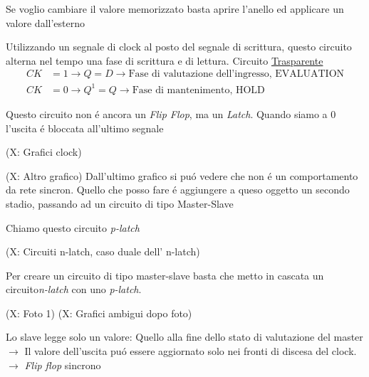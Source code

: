 \documentclass{article}
\begin{document}
Se voglio cambiare il valore memorizzato basta aprire l'anello ed applicare un valore dall'esterno

Utilizzando un segnale di clock al posto del segnale di scrittura, questo circuito alterna nel tempo una fase di scrittura e di lettura.
Circuito \underline{Trasparente}
\[
    \begin{aligned}
        CK &= 1 \rightarrow Q = D \rightarrow \text{Fase di valutazione dell'ingresso, EVALUATION}\\
        CK &= 0 \rightarrow Q^1 = Q \rightarrow \text{Fase di mantenimento, HOLD}
    \end{aligned}
\]

Questo circuito non \'e ancora un \textit{Flip Flop}, ma un \textit{Latch}. Quando siamo a $0$ l'uscita \'e bloccata all'ultimo segnale

(X: Grafici clock)

(X: Altro grafico)
Dall'ultimo grafico si pu\'o vedere che non \'e un comportamento da rete sincron. Quello che posso fare \'e aggiungere a queso oggetto un secondo stadio, passando ad un circuito di tipo Master-Slave

Chiamo questo circuito \textit{p-latch}

(X: Circuiti n-latch, caso duale dell' n-latch)

Per creare un circuito di tipo master-slave basta che metto in cascata un circuito\textit{n-latch} con uno \textit{p-latch}.

(X: Foto 1)
(X: Grafici ambigui dopo foto)

Lo slave legge solo un valore: Quello alla fine dello stato di valutazione del master $\rightarrow$ Il valore dell'uscita pu\'o essere aggiornato solo nei fronti di discesa del clock. $\rightarrow$ \textit{Flip flop} sincrono
\end{document}
